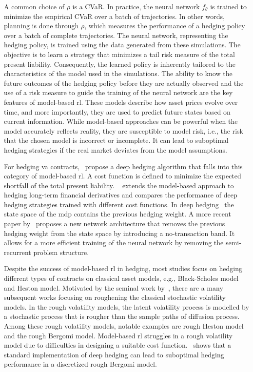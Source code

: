 A common choice of $\rho$ is a CVaR.
In practice, the neural network $f_{\theta}$ is trained to minimize the empirical CVaR over a batch of trajectories.
In other words, planning is done through $\rho$, which measures the performance of a hedging policy over a batch of complete trajectories.
The neural network, representing the hedging policy, is trained using the data generated from these simulations. 
The objective is to learn a strategy that minimizes a tail risk measure of the total present liability.
Consequently, the learned policy is inherently tailored to the characteristics of the model used in the simulations.
The ability to know the future outcomes of the hedging policy before they are actually observed and the use of a risk measure to guide the training of the neural network are the key features of model-based \gls{rl}.
These models describe how asset prices evolve over time, and more importantly, they are used to predict future states based on current information.
While model-based approaches can be powerful when the model accurately reflects reality, they are susceptible to model risk, i.e., the risk that the chosen model is incorrect or incomplete. 
It can lead to suboptimal hedging strategies if the real market deviates from the model assumptions.

For hedging \gls{va} contracts,~\cite{xu2020variable} propose a deep hedging algorithm that falls into this category of model-based \gls{rl}.
A cost function is defined to minimize the expected shortfall of the total present liability.
~\cite{carbonneau2021deep} extends the model-based approach to hedging long-term financial derivatives and compares the performance of deep hedging strategies trained with different cost functions.
In deep hedging~\citep{buehler2019deep} the state space of the \gls{mdp} contains the previous hedging weight.
A more recent paper by~\cite{imaki2021no} proposes a new network architecture that removes the previous hedging weight from the state space by introducing a no-transaction band.
It allows for a more efficient training of the neural network by removing the semi-recurrent problem structure.

Despite the success of model-based \gls{rl} in hedging, most studies focus on hedging different types of contracts on classical asset models, e.g., Black-Scholes model and Heston model.
Motivated by the seminal work by~\cite{gatheral2022volatility}, there are a many subsequent works focusing on roughening the classical stochastic volatility models. 
In the rough volatility models, the latent volatility process is modelled by a stochastic process that is rougher than the sample paths of diffusion process. 
Among these rough volatility models, notable examples are rough Heston model and the rough Bergomi model. 
Model-based \gls{rl} struggles in a rough volatility model due to difficulties in designing a suitable cost function.~\cite{horvath2021deep} shows that a standard implementation of deep hedging can lead to suboptimal hedging performance in a discretized rough Bergomi model. 

